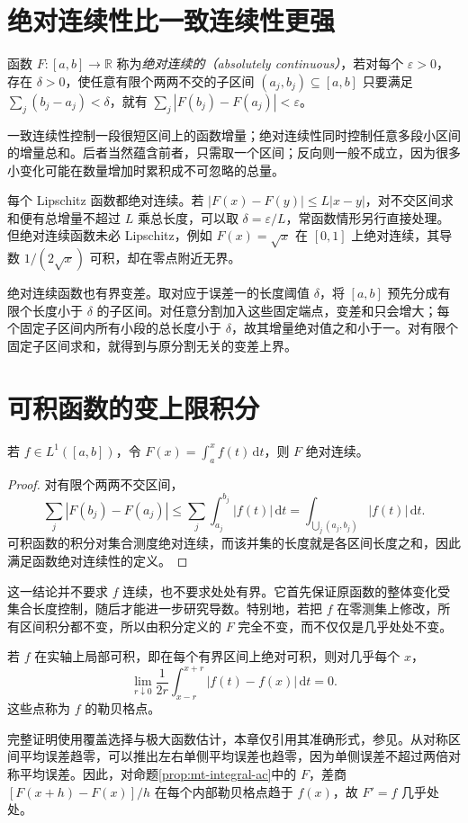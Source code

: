 \section{绝对连续性比一致连续性更强}
\begin{definition}
函数 $F:[a,b]\to\mathbb R$ 称为\emph{绝对连续的（absolutely continuous）}，若对每个 $\varepsilon>0$，存在 $\delta>0$，使任意有限个两两不交的子区间 $(a_j,b_j)\subseteq[a,b]$ 只要满足 $\sum_j(b_j-a_j)<\delta$，就有
$\sum_j|F(b_j)-F(a_j)|<\varepsilon$。
\end{definition}
一致连续性控制一段很短区间上的函数增量；绝对连续性同时控制任意多段小区间的增量总和。后者当然蕴含前者，只需取一个区间；反向则一般不成立，因为很多小变化可能在数量增加时累积成不可忽略的总量。

每个 Lipschitz 函数都绝对连续。若 $|F(x)-F(y)|\leq L|x-y|$，对不交区间求和便有总增量不超过 $L$ 乘总长度，可以取 $\delta=\varepsilon/L$，常函数情形另行直接处理。但绝对连续函数未必 Lipschitz，例如 $F(x)=\sqrt{x}$ 在 $[0,1]$ 上绝对连续，其导数 $1/(2\sqrt{x})$ 可积，却在零点附近无界。

绝对连续函数也有界变差。取对应于误差一的长度阈值 $\delta$，将 $[a,b]$ 预先分成有限个长度小于 $\delta$ 的子区间。对任意分割加入这些固定端点，变差和只会增大；每个固定子区间内所有小段的总长度小于 $\delta$，故其增量绝对值之和小于一。对有限个固定子区间求和，就得到与原分割无关的变差上界。

\section{可积函数的变上限积分}
\begin{proposition}
若 $f\in L^1([a,b])$，令 $F(x)=\int_a^xf(t)\,\mathrm dt$，则 $F$ 绝对连续。
\label{prop:mt-integral-ac}
\end{proposition}
\begin{proof}
对有限个两两不交区间，
\[
 \sum_j|F(b_j)-F(a_j)|
 \leq\sum_j\int_{a_j}^{b_j}|f(t)|\,\mathrm dt
 =\int_{\bigcup_j(a_j,b_j)}|f(t)|\,\mathrm dt.
\]
可积函数的积分对集合测度绝对连续，而该并集的长度就是各区间长度之和，因此满足函数绝对连续性的定义。
\end{proof}
这一结论并不要求 $f$ 连续，也不要求处处有界。它首先保证原函数的整体变化受集合长度控制，随后才能进一步研究导数。特别地，若把 $f$ 在零测集上修改，所有区间积分都不变，所以由积分定义的 $F$ 完全不变，而不仅仅是几乎处处不变。

\begin{theorem}[勒贝格微分定理的一维形式，引用]
若 $f$ 在实轴上局部可积，即在每个有界区间上绝对可积，则对几乎每个 $x$，
\[
 \lim_{r\downarrow0}\frac1{2r}\int_{x-r}^{x+r}|f(t)-f(x)|\,\mathrm dt=0.
\]
这些点称为 $f$ 的勒贝格点。
\label{thm:mt-lebesgue-differentiation}
\end{theorem}
完整证明使用覆盖选择与极大函数估计，本章仅引用其准确形式，参见\cite[第22--23讲]{mit-measure}。从对称区间平均误差趋零，可以推出左右单侧平均误差也趋零，因为单侧误差不超过两倍对称平均误差。因此，对命题\ref{prop:mt-integral-ac}中的 $F$，差商
$[F(x+h)-F(x)]/h$ 在每个内部勒贝格点趋于 $f(x)$，故 $F'=f$ 几乎处处。


